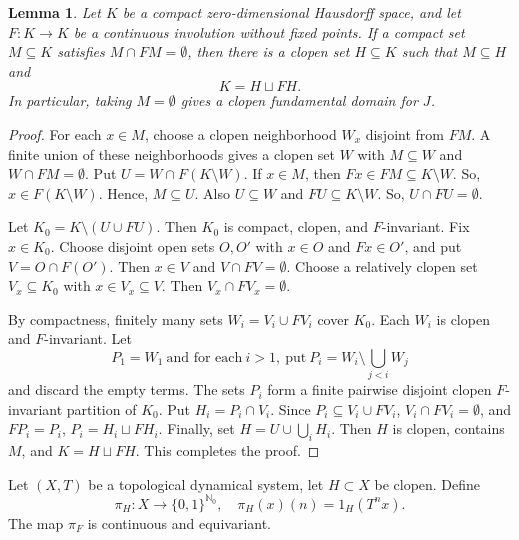 \documentclass[reqno,12pt]{amsart}
\newtheorem{lemma}[thm]{Lemma}
\newcommand{\Nzero}{\mathbb N_0}
\newcommand{\two}{\{0,1\}}
\numberwithin{equation}{section}
\begin{document}
\begin{lemma}\label{lem:clopen-domain}
	Let $K$ be a compact zero-dimensional Hausdorff space, and let
	$F:K\to K$ be a continuous involution without fixed points.  If a compact set
	$M\subseteq K$ satisfies $M\cap FM=\emptyset$, then there is a clopen set
	$H\subseteq K$ such that $M\subseteq H$ and
	\begin{equation}\label{eq:clopen-domain}
	K=H\sqcup FH.
	\end{equation}
In particular, taking $M=\emptyset$ gives a clopen fundamental domain for
$J$.
\end{lemma}
\begin{proof}
	For each $x\in M$, choose a clopen neighborhood $W_x$ disjoint from $FM$.
	A finite union of these neighborhoods gives a clopen set $W$ with
	$M\subseteq W$ and $W\cap FM=\emptyset$.  Put
	$
	U=W\cap F(K\setminus W).
	$
	If $x\in M$, then $Fx\in FM\subseteq K\setminus W$. So,
	$x\in F(K\setminus W)$. Hence, $M\subseteq U$.  Also $U\subseteq W$ and
	$FU\subseteq K\setminus W$. So, $U\cap FU=\emptyset$.
	
	Let
	$
	K_0=K\setminus(U\cup FU).
	$
	Then $K_0$ is compact, clopen, and $F$-invariant.  Fix $x\in K_0$.  Choose
	disjoint open sets $O,O'$ with $x\in O$ and $Fx\in O'$, and put
	$V=O\cap F(O')$.  Then $x\in V$ and $V\cap FV=\emptyset$. Choose a relatively clopen set $V_x\subseteq K_0$ with
	$x\in V_x\subseteq V$. Then $V_x\cap FV_x=\emptyset$.
	
	By compactness, finitely many sets $W_i=V_i\cup FV_i$ cover $K_0$.  Each
	$W_i$ is clopen and $F$-invariant. Let
	\[
	P_1=W_1\ \text{and for each}\ i>1,\ \text{put}\
	P_i=W_i\setminus\bigcup_{j<i}W_j
	\]
	and discard the empty terms.  The sets $P_i$ form a finite pairwise disjoint
	clopen $F$-invariant partition of $K_0$.  Put $H_i=P_i\cap V_i$.  Since
	$P_i\subseteq V_i\cup FV_i$, $V_i\cap FV_i=\emptyset$, and $FP_i=P_i$,
	$
	P_i=H_i\sqcup FH_i.
	$
	Finally, set
	$
	H=U\cup\bigcup_iH_i.
	$
	Then $H$ is clopen, contains $M$, and $K=H\sqcup FH$. This completes the proof.
\end{proof}

Let $(X,T)$ be a topological dynamical system, let $H\subset X$ be clopen. 
Define
\begin{equation*}
\pi_H:X\to\two^{\Nzero},\quad
\pi_H(x)(n)=1_H(T^nx).
\end{equation*}
The map $\pi_F$ is continuous and equivariant. 
\end{document}
